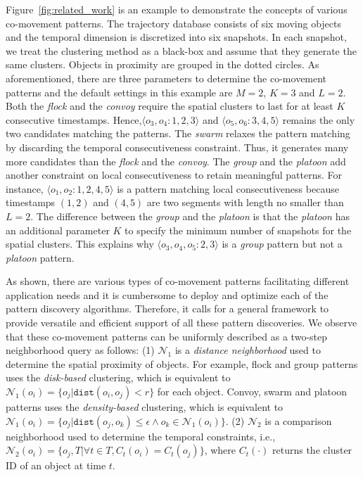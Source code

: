 Figure~\ref{fig:related_work} is an example to demonstrate the concepts of various co-movement patterns. The trajectory database consists of six moving objects and the temporal dimension is discretized into six snapshots. In each snapshot, we treat the clustering method as a black-box and assume that they generate the same clusters. Objects in proximity are grouped in the dotted circles. As aforementioned, there are three parameters to determine the co-movement patterns and the default settings in this example are $M=2$, $K=3$ and $L=2$. Both the \emph{flock} and the \emph{convoy} require the spatial clusters to last for at least $K$ consecutive  timestamps. Hence,$\langle o_3,o_4:1,2,3 \rangle$ and $\langle o_5,o_6:3,4,5 \rangle$  remains the only two candidates matching the patterns. The \textit{swarm} relaxes the pattern matching by discarding the temporal consecutiveness constraint. Thus, it generates many more candidates than the \textit{flock} and the \textit{convoy}. The \textit{group} and the \textit{platoon} add another constraint on local consecutiveness to retain meaningful patterns. For instance, $\langle o_1,o_2:1,2,4,5 \rangle$ is a pattern matching local consecutiveness because timestamps $(1,2)$ and $(4,5)$ are two segments with length no smaller than $L=2$. The difference between the \textit{group} and the \textit{platoon} is that the \textit{platoon} has an additional parameter $K$ to specify the minimum number of snapshots for the spatial clusters. This explains why $\langle o_3,o_4,o_5:2,3 \rangle$ is a \textit{group} pattern but not a \textit{platoon} pattern.


As shown, there are various types of co-movement patterns facilitating different application needs and it is cumbersome to deploy and optimize each of the pattern discovery algorithms. Therefore, it calls for a general framework to provide versatile and efficient support of all these pattern discoveries. We observe that 
these co-movement patterns can be uniformly described as a two-step neighborhood query as follows:
	(1) $\mathcal{N}_1$ is a \emph{distance neighborhood} used to determine the spatial proximity of objects. For example,  flock and group patterns uses the \emph{disk-based} clustering, which is equivalent to $\mathcal{N}_1(o_i)= \{o_j | \mathtt{dist}(o_i,o_j) < r \}$ for each object. Convoy, swarm and platoon patterns uses the \emph{density-based} clustering, which is equivalent to $\mathcal{N}_1(o_i)= \{o_j | \mathtt{dist}(o_j,o_k) \leq \epsilon \wedge o_k \in \mathcal{N}_1(o_i)\}$.
	(2) $\mathcal{N}_2$ is a comparison neighborhood used to determine the temporal constraints, i.e., $\mathcal{N}_2(o_i)=\{o_j, T | \forall t \in T, C_t(o_i) = C_t(o_j)\}$, where $C_t(\cdot)$ returns the cluster ID of an object at time $t$.

